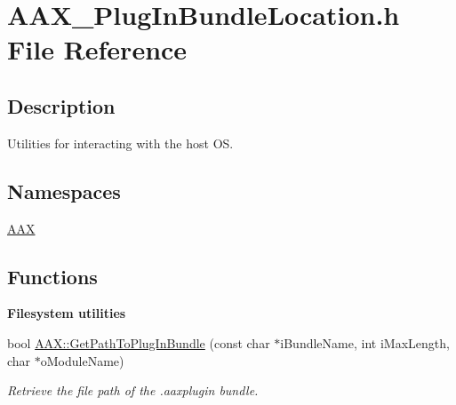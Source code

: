 \hypertarget{a00740}{}\section{A\+A\+X\+\_\+\+Plug\+In\+Bundle\+Location.\+h File Reference}
\label{a00740}


\subsection{Description}
Utilities for interacting with the host OS. 

\subsection*{Namespaces}
\begin{DoxyCompactItemize}
\item 
 \mbox{\hyperlink{a00852}{A\+AX}}
\end{DoxyCompactItemize}
\subsection*{Functions}
\begin{Indent}\textbf{ Filesystem utilities}\par
\begin{DoxyCompactItemize}
\item 
bool \mbox{\hyperlink{a00840_ga0bf6aab757ecbd440276bb001de89f19}{A\+A\+X\+::\+Get\+Path\+To\+Plug\+In\+Bundle}} (const char $\ast$i\+Bundle\+Name, int i\+Max\+Length, char $\ast$o\+Module\+Name)
\begin{DoxyCompactList}\small\item\em Retrieve the file path of the .aaxplugin bundle. \end{DoxyCompactList}\end{DoxyCompactItemize}
\end{Indent}
